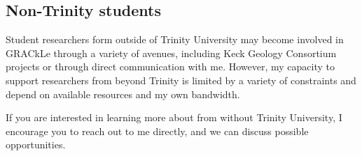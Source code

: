 \subsection{Non-Trinity students}
Student researchers form outside of Trinity University may become involved in GRACkLe through a variety of avenues, including Keck Geology Consortium projects or through direct communication with me.
However, my capacity to support researchers from beyond Trinity is limited by a variety of constraints and depend on available resources and my own bandwidth. 

If you are interested in learning more about \grackle{} from without Trinity University, I encourage you to reach out to me directly, and we can discuss possible opportunities.


